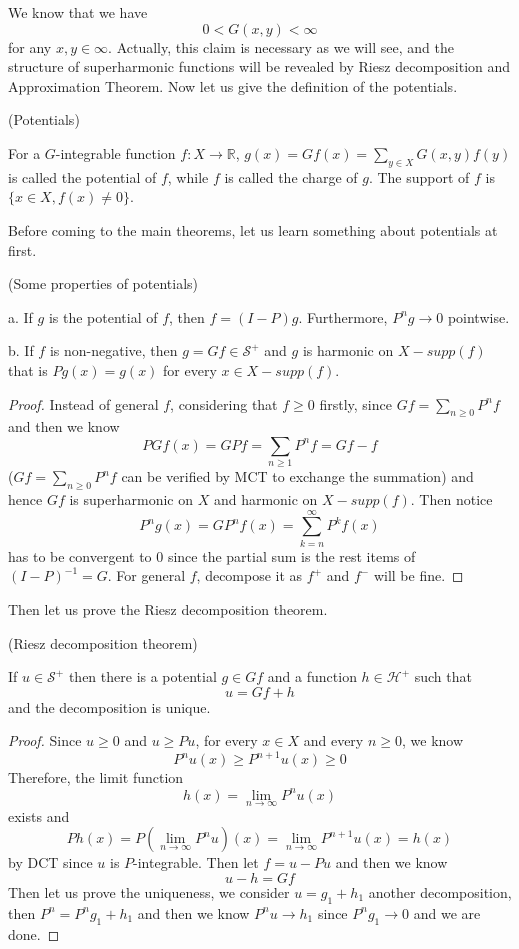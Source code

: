 \documentclass[lang=en,11pt,a4paper,citestyle =authoryear]{elegantpaper}
\newcommand{\R}{\mathbb{R}}
\newcommand{\Har}{\mathcal{H}}
\newcommand{\Sar}{\mathcal{S}}
\begin{document}
We know that we have
\[
0<G(x,y) < \infty
\]
for any $x,y \in \infty$. Actually, this claim is necessary as we will see, and the structure of superharmonic functions will be revealed by Riesz decomposition and Approximation Theorem. Now let us give the definition of the potentials.

\begin{definition}
    (Potentials)\par
    For a $G$-integrable function $f:X\to \R$, $g(x) = Gf(x) = \sum\limits_{y\in X}G(x,y)f(y)$ is called the potential of $f$, while $f$ is called the charge of $g$. The support of $f$ is $\{x\in X, f(x) \neq 0\}$.
\end{definition}

Before coming to the main theorems, let us learn something about potentials at first.

\begin{proposition}(Some properties of potentials)\par
    a. If $g$ is the potential of $f$, then $f = (I-P)g$. Furthermore, $P^ng\to 0$ pointwise.\par
    b. If $f$ is non-negative, then $g = Gf \in \Sar^+$ and $g$ is harmonic on $X- supp(f)$ that is $Pg(x) = g(x)$ for every $x\in X-supp(f)$.
\end{proposition}
\begin{proof}
    Instead of general $f$, considering that $f \geq 0$ firstly, since $Gf = \sum\limits_{n\geq 0}P^nf$ and then we know
    \[
    P Gf(x) = G Pf = \sum\limits_{n\geq 1}P^n f = Gf - f
    \]
    ($Gf = \sum\limits_{n\geq 0}P^nf$ can be verified by MCT to exchange the summation) and hence $Gf$ is superharmonic on $X$ and harmonic on $X-supp(f)$. Then notice
    \[
    P^ng(x) = GP^nf(x) = \sum\limits_{k=n}^{\infty}P^kf(x)
    \]
    has to be convergent to $0$ since the partial sum is the rest items of $(I-P)^{-1} = G$. For general $f$, decompose it as $f^+$ and $f^-$ will be fine.
\end{proof}

Then let us prove the Riesz decomposition theorem.

\begin{theorem}
    (Riesz decomposition theorem)\par If $u\in \Sar^+$ then there is a potential $g\in Gf$ and a function $h\in\Har^+$ such that
    \[u = Gf + h\]
    and the decomposition is unique.
\end{theorem}
\begin{proof}
    Since $u\geq 0$ and $u\geq Pu$, for every $x\in X$ and every $n\geq 0$, we know
    \[
    P^nu(x) \geq P^{n+1}u(x) \geq 0
    \]
    Therefore, the limit function
    \[
    h(x) = \lim_{n\to\infty} P^nu(x)
    \]
    exists and
    \[
    Ph(x) = P(\lim_{n\to\infty} P^n u)(x) = \lim_{n\to\infty}P^{n+1}u(x) = h(x)
    \]
    by DCT since $u$ is $P$-integrable. Then let $f = u - Pu$ and then we know
    \[
    u-h = Gf
    \]
    Then let us prove the uniqueness, we consider $u = g_1+h_1$ another decomposition, then $P^n = P^ng_1 + h_1$ and then we know $P^n u \to h_1$ since $P^ng_1 \to 0$ and we are done.
\end{proof}
\end{document}
